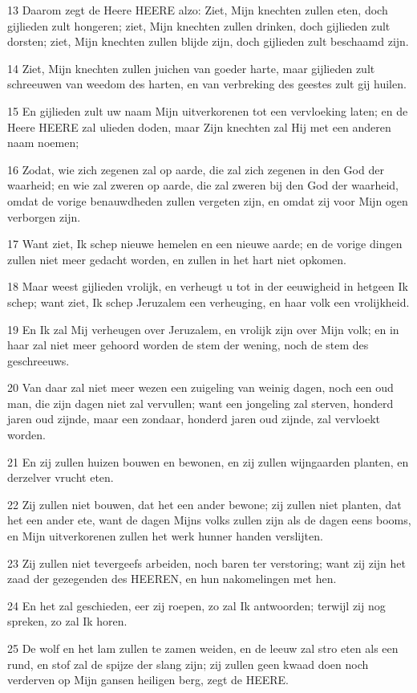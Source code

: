 \par 13 Daarom zegt de Heere HEERE alzo: Ziet, Mijn knechten zullen eten, doch gijlieden zult hongeren; ziet, Mijn knechten zullen drinken, doch gijlieden zult dorsten; ziet, Mijn knechten zullen blijde zijn, doch gijlieden zult beschaamd zijn.
\par 14 Ziet, Mijn knechten zullen juichen van goeder harte, maar gijlieden zult schreeuwen van weedom des harten, en van verbreking des geestes zult gij huilen.
\par 15 En gijlieden zult uw naam Mijn uitverkorenen tot een vervloeking laten; en de Heere HEERE zal ulieden doden, maar Zijn knechten zal Hij met een anderen naam noemen;
\par 16 Zodat, wie zich zegenen zal op aarde, die zal zich zegenen in den God der waarheid; en wie zal zweren op aarde, die zal zweren bij den God der waarheid, omdat de vorige benauwdheden zullen vergeten zijn, en omdat zij voor Mijn ogen verborgen zijn.
\par 17 Want ziet, Ik schep nieuwe hemelen en een nieuwe aarde; en de vorige dingen zullen niet meer gedacht worden, en zullen in het hart niet opkomen.
\par 18 Maar weest gijlieden vrolijk, en verheugt u tot in der eeuwigheid in hetgeen Ik schep; want ziet, Ik schep Jeruzalem een verheuging, en haar volk een vrolijkheid.
\par 19 En Ik zal Mij verheugen over Jeruzalem, en vrolijk zijn over Mijn volk; en in haar zal niet meer gehoord worden de stem der wening, noch de stem des geschreeuws.
\par 20 Van daar zal niet meer wezen een zuigeling van weinig dagen, noch een oud man, die zijn dagen niet zal vervullen; want een jongeling zal sterven, honderd jaren oud zijnde, maar een zondaar, honderd jaren oud zijnde, zal vervloekt worden.
\par 21 En zij zullen huizen bouwen en bewonen, en zij zullen wijngaarden planten, en derzelver vrucht eten.
\par 22 Zij zullen niet bouwen, dat het een ander bewone; zij zullen niet planten, dat het een ander ete, want de dagen Mijns volks zullen zijn als de dagen eens booms, en Mijn uitverkorenen zullen het werk hunner handen verslijten.
\par 23 Zij zullen niet tevergeefs arbeiden, noch baren ter verstoring; want zij zijn het zaad der gezegenden des HEEREN, en hun nakomelingen met hen.
\par 24 En het zal geschieden, eer zij roepen, zo zal Ik antwoorden; terwijl zij nog spreken, zo zal Ik horen.
\par 25 De wolf en het lam zullen te zamen weiden, en de leeuw zal stro eten als een rund, en stof zal de spijze der slang zijn; zij zullen geen kwaad doen noch verderven op Mijn gansen heiligen berg, zegt de HEERE.

